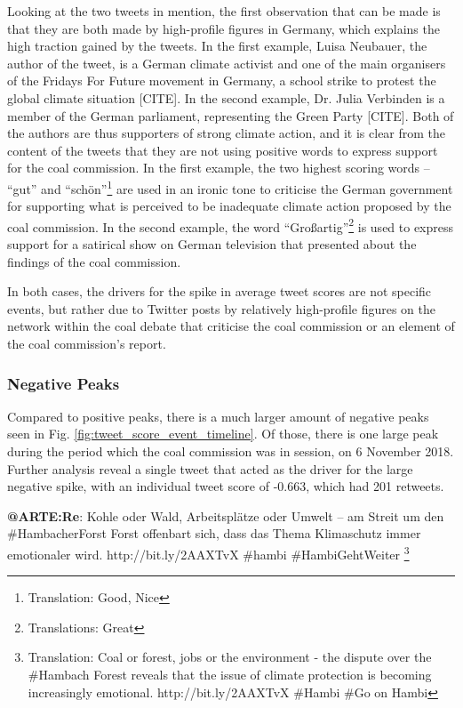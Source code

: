 \documentclass[12pt,onecolumn,twoside]{layout}
\begin{document}
Looking at the two tweets in mention, the first observation that can be made is that they are both made by high-profile figures in Germany, which explains the high traction gained by the tweets. In the first example, Luisa Neubauer, the author of the tweet, is a German climate activist and one of the main organisers of the Fridays For Future movement in Germany, a school strike to protest the global climate situation [CITE]. In the second example, Dr. Julia Verbinden is a member of the German parliament, representing the Green Party [CITE]. Both of the authors are thus supporters of strong climate action, and it is clear from the content of the tweets that they are not using positive words to express support for the coal commission. In the first example, the two highest scoring words -- ``gut'' and ``schön''\footnote{Translation: Good, Nice} are used in an ironic tone to criticise the German government for supporting what is perceived to be inadequate climate action proposed by the coal commission. In the second example, the word ``Großartig''\footnote{Translations: Great} is used to express support for a satirical show on German television that presented about the findings of the coal commission. 

In both cases, the drivers for the spike in average tweet scores are not specific events, but rather due to Twitter posts by relatively high-profile figures on the network within the coal debate that criticise the coal commission or an element of the coal commission's report. 

\subsubsection*{Negative Peaks} %
Compared to positive peaks, there is a much larger amount of negative peaks seen in Fig. \ref{fig:tweet_score_event_timeline}. Of those, there is one large peak during the period which the coal commission was in session, on 6 November 2018. Further analysis reveal a single tweet that acted as the driver for the large negative spike, with an individual tweet score of -0.663, which had 201 retweets. 

\begin{displayquote}
	\textbf{@ARTE:Re}: Kohle oder Wald, Arbeitsplätze oder Umwelt – am Streit um den \#HambacherForst Forst offenbart sich, dass das Thema Klimaschutz immer emotionaler wird. http://bit.ly/2AAXTvX \#hambi \#HambiGehtWeiter
	\footnote{Translation: Coal or forest, jobs or the environment - the dispute over the \#Hambach Forest reveals that the issue of climate protection is becoming increasingly emotional. http://bit.ly/2AAXTvX \#Hambi \#Go on Hambi}
\end{displayquote}
\end{document}

